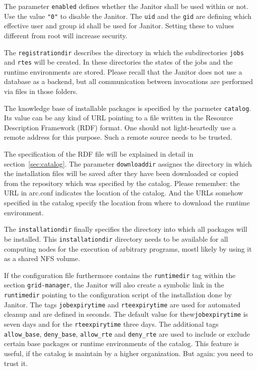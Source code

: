 The parameter \texttt{enabled} defines whether the Janitor shall be
used within \AREX or not. Use the value \texttt{"0"} to disable the
Janitor. The \texttt{uid} and the \texttt{gid} are defining which
effective user and group id shall be used for Janitor. Setting these to
values different from root will increase security.

The \texttt{registrationdir} describes the directory in which
the subdirectories \texttt{jobs} and \texttt{rtes} will be created.
In these directories the states of the jobs and the runtime environments
are stored. Please recall that the Janitor does not use a database as
a backend, but all communication between invocations are performed via
files in those folders.

The knowledge base of installable packages is specified by the parmeter
\texttt{catalog}.  Its value can be any kind of URL pointing to a file
written in the Resource Description Framework (RDF) format. One should
not light-heartedly use a remote address for this purpose. Such a remote
source needs to be trusted.

The specification of the RDF file will be explained in detail in
section~\ref{sec:catalog}.  The parameter \texttt{downloaddir} assignes
the directory in which the installation files will be saved after they
have been downloaded or copied from the repository which was specified by
the catalog. Please remember: the URL in arc.conf indicates the location
of the catalog. And the URLs somehow specified in the catalog specify
the location from where to download the runtime environment.

The \texttt{installationdir} finally specifies the directory into which
all packages will be installed. This \texttt{installationdir} directory
needs to be available for all computing nodes for the execution of 
arbitrary programs, mostl likely by using it as a shared NFS volume.

If the configuration file furthermore contains the \texttt{runtimedir}
tag within the section \texttt{grid-manager}, the Janitor will
also create a symbolic link in the \texttt{runtimedir} pointing to
the configuration script of the installation done by Janitor. The
tags \texttt{jobexpirytime} and \texttt{rteexpirytime} are used
for automated cleanup and are defined in seconds.  The default
value for thew\texttt{jobexpirytime} is seven days and for
the \texttt{rteexpirytime} three days.  The additional tags
\texttt{allow\_base}, \texttt{deny\_base}, \texttt{allow\_rte} and
\texttt{deny\_rte} are used to include or exclude certain base packages
or runtime environments of the catalog. This feature is useful, if the
catalog is maintain by a higher organization. But again: you need to
trust it.

